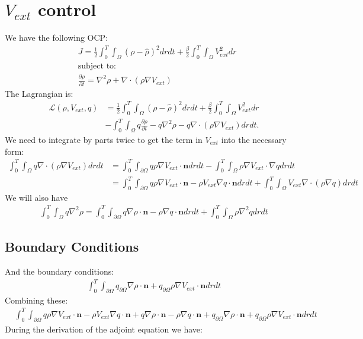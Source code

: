 \documentclass[11pt, a4paper]{article}
\theoremstyle{definition}
\newcommand{\n}{\mathbf{n}}
\begin{document}
	\section{$V_{ext}$ control}
	We have the following OCP:
	\begin{align*}
		&J = \frac{1}{2}\int_0^T \int_\Omega (\rho - \widehat \rho)^2 dr dt + \frac{\beta}{2} \int_0^T\int_\Omega V_{ext}^2 dr\\
		&\text{subject to:}\\
		&\frac{\partial \rho}{\partial t} = \nabla^2 \rho + \nabla \cdot (\rho \nabla V_{ext})
	\end{align*}
	The Lagrangian is:
	\begin{align*}
		\mathcal{L}(\rho, V_{ext}, q) &= \frac{1}{2}\int_0^T \int_\Omega (\rho - \widehat \rho)^2 dr dt + \frac{\beta}{2} \int_0^T\int_\Omega V_{ext}^2 dr\\
		&- \int_0^T \int_\Omega q\frac{\partial \rho}{\partial t} - q\nabla^2 \rho - q\nabla \cdot (\rho \nabla V_{ext}) dr dt.
	\end{align*}
	We need to integrate by parts twice to get the term in $V_{ext}$ into the necessary form:
	\begin{align*}
		\int_0^T \int_\Omega q \nabla \cdot (\rho \nabla V_{ext}) dr dt &= \int_0^T \int_{\partial \Omega} q \rho \nabla V_{ext} \cdot \n dr dt - \int_0^T \int_\Omega \rho \nabla V_{ext} \cdot \nabla q dr dt \\
		& = \int_0^T \int_{\partial \Omega} q \rho \nabla V_{ext} \cdot \n  - \rho V_{ext} \nabla q \cdot \n dr dt + \int_0^T \int_\Omega V_{ext} \nabla \cdot (\rho \nabla q) dr dt
	\end{align*}
	We will also have 
	\begin{align*}
		\int_0^T \int_\Omega q\nabla^2 \rho = \int_0^T \int_{\partial \Omega} q \nabla \rho \cdot \n- \rho \nabla q \cdot \n dr dt + \int_0^T \int_\Omega \rho \nabla^2 q dr dt
	\end{align*}
	\subsection{Boundary Conditions}
	And the boundary conditions:
	\begin{align*}
		\int_0^T \int_{\partial \Omega} q_{\partial \Omega}\nabla \rho \cdot \n + q_{\partial \Omega}\rho \nabla V_{ext} \cdot \n dr dt
	\end{align*}
	Combining these:
	\begin{align*}
		&\int_0^T \int_{\partial \Omega} q \rho \nabla V_{ext} \cdot \n  - \rho V_{ext} \nabla q \cdot \n + q \nabla \rho \cdot \n - \rho \nabla q \cdot \n + q_{\partial \Omega}\nabla \rho \cdot \n + q_{\partial \Omega}\rho \nabla V_{ext} \cdot \n dr dt
	\end{align*}
	During the derivation of the adjoint equation we have:
\end{document}
